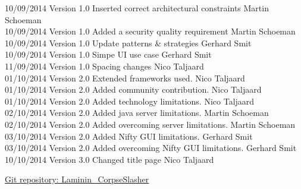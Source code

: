 \documentclass[letterpaper]{article}
\begin{document}
\begin{tabbing}
			10/09/2014  \> Version 1.0  \> Inserted correct architectural constraints	\> Martin Schoeman\\
			10/09/2014	\> Version 1.0  \> Added a security quality requirement			\> Martin Schoeman\\
			10/09/2014	\> Version 1.0	\> Update patterns \& strategies				\> Gerhard Smit \\
			10/09/2014	\> Version 1.0	\> Simpe UI use case							\> Gerhard Smit \\
			11/09/2014	\> Version 1.0	\> Spacing changes								\> Nico Taljaard \\
			01/10/2014	\> Version 2.0	\> Extended frameworks used.					\> Nico Taljaard \\
			01/10/2014	\> Version 2.0	\> Added community contribution.				\> Nico Taljaard \\
			01/10/2014	\> Version 2.0	\> Added technology limitations.				\> Nico Taljaard \\
			02/10/2014	\> Version 2.0	\> Added java server limitations.				\> Martin Schoeman\\
			02/10/2014	\> Version 2.0	\> Added overcoming server limitations.			\> Martin Schoeman\\
			03/10/2014	\> Version 2.0	\> Added Nifty GUI limitations.					\> Gerhard Smit\\
			03/10/2014	\> Version 2.0	\> Added overcoming Nifty GUI limitations.		\> Gerhard Smit\\
			10/10/2014	\> Version 3.0	\> Changed title page							\> Nico Taljaard\\
		\end{tabbing}
		
	\newpage
		\renewcommand\contentsname{TABLE OF CONTENTS}
		\newcommand\contentsnameLC{\colorbox{black}{\makebox[\textwidth-2\fboxsep][l]{\bfseries\color{red} Table of Contents}}}
		
		\renewcommand{\cftdot}{}
		\hypersetup{linktocpage}
		\tableofcontents
		
		\begin{flushleft}
			\LARGE\href{https://github.com/njTaljaard/Laminin_CorpseSlasher/}{Git repository: Laminin\_CorpseSlasher}
		\end{flushleft}
		
	\newpage
	
		\section*{\colorbox{black}{}} 
		\vspace{0.2in}
		
\end{document}
